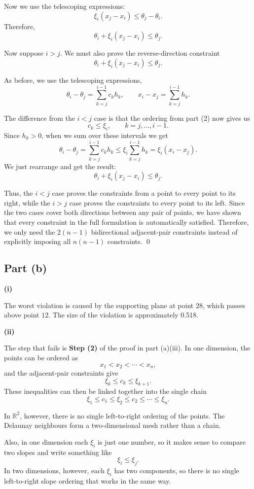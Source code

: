 \documentclass{article}
\begin{document}
Now we use the telescoping expressions: 
\[
\xi_i(x_j-x_i)
\leq
\theta_j-\theta_i.
\]
Therefore,
\[
\theta_i+\xi_i(x_j-x_i)\leq\theta_j.
\]

Now suppose $i>j$. We must also prove the reverse-direction constraint
\[
\theta_i+\xi_i(x_j-x_i)\leq\theta_j.
\]

As before, we use the telescoping expressions,
\[
\theta_i-\theta_j
=
\sum_{k=j}^{i-1}c_kh_k,
\qquad
x_i-x_j
=
\sum_{k=j}^{i-1}h_k.
\]

The difference from the $i<j$ case is that the ordering from part (2)
now gives us 
\[
c_k\leq\xi_i,
\qquad k=j,\ldots,i-1.
\]
Since $h_k>0$, when we sum over these intervals we get 
\[
\theta_i-\theta_j
=
\sum_{k=j}^{i-1}c_kh_k
\leq
\xi_i\sum_{k=j}^{i-1}h_k
=
\xi_i(x_i-x_j).
\]
We just rearrange and get the result: 
\[
\theta_i+\xi_i(x_j-x_i)\leq\theta_j.
\]

Thus, the $i<j$ case proves the constraints from a point to every point
to its right, while the $i>j$ case proves the constraints to every point
to its left. Since the two cases cover both directions between any pair of points,
we have shown that every constraint in the full formulation is
automatically satisfied. Therefore, we only need the $2(n-1)$
bidirectional adjacent-pair constraints instead of explicitly imposing
all $n(n-1)$ constraints. \qed


\newpage
\subsection*{Part (b)}

\textbf{(i)}

The worst violation is caused by the supporting plane at point $28$,
which passes above point $12$. The size of the violation is approximately 0.518.


\vspace{5mm}
\textbf{(ii)}

The step that fails is \textbf{Step (2)} of the proof in part (a)(iii). In one
dimension, the points can be ordered as
\[
x_1<x_2<\cdots<x_n,
\]
and the adjacent-pair constraints give
\[
\xi_k\leq c_k\leq\xi_{k+1}.
\]
These inequalities can then be linked together into the single chain
\[
\xi_1\leq c_1\leq\xi_2\leq c_2\leq\cdots\leq\xi_n.
\]

In $\mathbb{R}^2$, however, there is no single left-to-right ordering of
the points. The Delaunay neighbours form a two-dimensional mesh rather
than a chain. 

Also, in one dimension each $\xi_i$ is just one number, so it makes
sense to compare two slopes and write something like
\[
\xi_i\leq\xi_j.
\]
In two dimensions, however, each $\xi_i$ has two components, so there is no
single left-to-right slope ordering that works in the same way.
\end{document}
